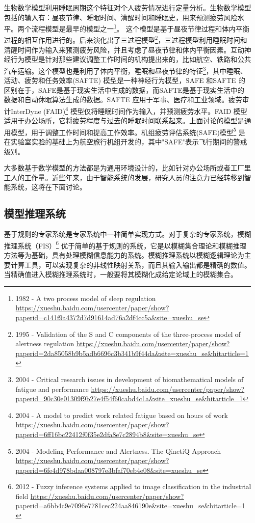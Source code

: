 生物数学模型利用睡眠周期这个特征对个人疲劳情况进行定量分析。生物数学模型包括的输入有：昼夜节律、睡眠时间、清醒时间和睡眠史，用来预测疲劳风险水平。两个流程模型是最早的模型之一\footnote{1982 - A two process model of sleep regulation \quad \url{https://xueshu.baidu.com/usercenter/paper/show?paperid=c141f9a4372d7d91614ad76a2df4cc5a&site=xueshu_se}}。 这个模型是基于昼夜节律过程和体内平衡过程的相互作用进行的。后来演化出了三过程模型\footnote{1995 - Validation of the S and C components of
the three-process model of alertness regulation \quad \url{https://xueshu.baidu.com/usercenter/paper/show?paperid=2da85058b9b5adb6696c3b341b9f44da&site=xueshu_se&hitarticle=1}}，三过程模型利用睡眠时间和清醒时间作为输入来预测疲劳风险，并且考虑了昼夜节律和体内平衡因素。互动神经行为模型是针对那些建议调整工作时间的机构提出来的，比如航空、铁路和公共汽车运输。这个模型也是利用了体内平衡，睡眠和昼夜节律的特征\footnote{2004 - Critical research issues in development of biomathematical models of fatigue and performance \quad \url{https://xueshu.baidu.com/usercenter/paper/show?paperid=90c30e01309f9b27e4f54f60cabd4c1a&site=xueshu_se&hitarticle=1}}，其中睡眠、活动、疲劳和任务效率(SAFTE) 模型是一种神经行为模型，SAFE 和SAFTE 的区别在于，SAFE是基于现实生活中生成的数据，而SAFTE是基于现实生活中的数据和自动休眠算法生成的数据。SAFTE 应用于军事、医疗和工业领域。疲劳审计InterDyne (FAID)\footnote{2004 - A model to predict work related fatigue based on hours of work \quad \url{https://xueshu.baidu.com/usercenter/paper/show?paperid=6ff16bc22412f0f35e2dfa8e7c2894b8&site=xueshu_se}} 模型仅将睡眠时间作为输入，并预测疲劳水平。FAID 模型适用于办公场所，它将疲劳程度与过去的睡眠时间联系起来。上面讨论的模型是通用模型，用于调整工作时间和提高工作效率。机组疲劳评估系统(SAFE)模型\footnote{2004 - Modeling Performance and Alertness. The QinetiQ Approach \quad \url{https://xueshu.baidu.com/usercenter/paper/show?paperid=6fe4d978bdaa008797e3bfaf70eb4e08&site=xueshu_se}} 是在实验室实验的基础上为航空旅行机组开发的，其中"SAFE"表示飞行期间的警戒级别。

大多数基于数学模型的方法都是为通用环境设计的，比如针对办公场所或者工厂里工人的工作量。近些年来，由于智能系统的发展，研究人员的注意力已经转移到智能系统，这将在下面讨论。

\subsection{模型推理系统}

基于规则的专家系统是专家系统中一种简单实现方式。对于复杂的专家系统，模糊推理系统（FIS）\footnote{2012 - Fuzzy inference
systems applied to image classification in the industrial field \quad \url{https://xueshu.baidu.com/usercenter/paper/show?paperid=a6bb4c9e7096e7781cec224aa846190e&site=xueshu_se&hitarticle=1}} 优于简单的基于规则的系统，它是以模糊集合理论和模糊推理方法等为基础，具有处理模糊信息能力的系统。模糊推理系统以模糊逻辑理论为主要计算工具，可以实现复杂的非线性映射关系，而且其输入输出都是精确的数值。当精确值进入模糊推理系统时，一般要将其模糊化成给定论域上的模糊集合。

